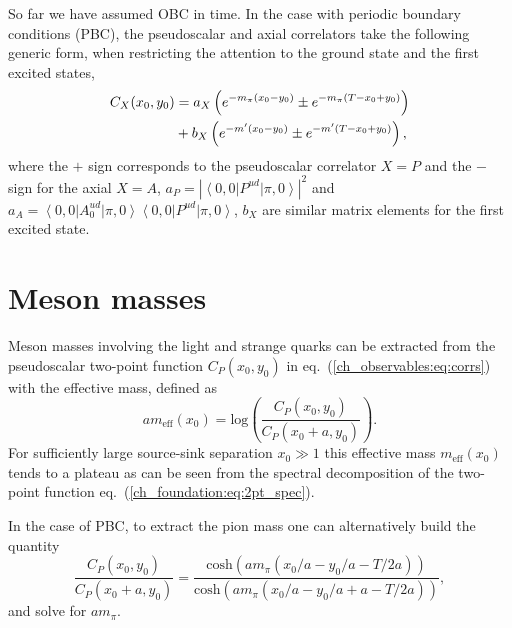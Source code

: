 So far we have assumed OBC in time. In the case with periodic boundary conditions (PBC), the pseudoscalar and axial correlators take the following generic form, when restricting the attention to the ground state and the first excited states,
\begin{align}
\label{ch_observables:eq:corrs_PBC}
C_X(x_0,y_0)&=a_X\left(e^{-m_{\pi}(x_0-y_0)}\pm e^{-m_{\pi}(T-x_0+y_0)}\right) \notag \\
&+b_X\left(e^{-m'(x_0-y_0)}\pm e^{-m'(T-x_0+y_0)}\right),
\end{align}
where the $+$ sign corresponds to the pseudoscalar correlator $X=P$ and the $-$ sign for the axial $X=A$,  $a_P=|\left<0,0\right|P^{ud}\left|\pi,0\right>|^2$ and $a_A=\left<0,0\right|A_0^{ud}\left|\pi,0\right>\left<0,0\right|P^{ud}\left|\pi,0\right>$, $b_X$ are similar matrix elements for the first excited state. 


\section{Meson masses}
\label{ch_observables:sec:meson_mass}

Meson masses involving the light and strange quarks can be extracted from the pseudoscalar two-point function $C_P(x_0,y_0)$ in eq.~(\ref{ch_observables:eq:corrs}) with the effective mass, defined as
\begin{equation}
\label{ch_observables:eq:meff}
am_{\textrm{eff}}(x_0)={\textrm{log}}\left(\frac{C_P(x_0,y_0)}{C_P(x_0+a,y_0)}\right).
\end{equation}
For sufficiently large source-sink separation $x_0\gg 1$ this effective mass $m_{\textrm{eff}}(x_0)$ tends to a plateau as can be seen from the spectral decomposition of the two-point function eq.~(\ref{ch_foundation:eq:2pt_spec}).

In the case of PBC, to extract the pion mass one can alternatively build the quantity
\begin{equation}
\label{ch_observables:eq:meff_PBC}
\frac{C_P(x_0,y_0)}{C_P(x_0+a,y_0)}=\frac{{\textrm{cosh}}(am_{\pi}(x_0/a-y_0/a-T/2a))}{{\textrm{cosh}}(am_{\pi}(x_0/a-y_0/a+a-T/2a))},
\end{equation}
and solve for $am_{\pi}$.

